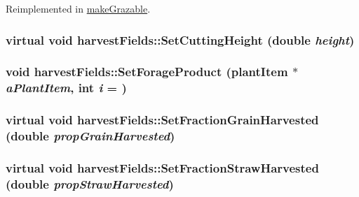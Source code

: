 Reimplemented in \hyperlink{classmake_grazable_a0c637b243ff0bc8232d121553f417573}{makeGrazable}.\hypertarget{classharvest_fields_a866acc00456f874d384414c557818194}{
\subsubsection[{SetCuttingHeight}]{\setlength{\rightskip}{0pt plus 5cm}virtual void harvestFields::SetCuttingHeight (double {\em height})}}
\label{classharvest_fields_a866acc00456f874d384414c557818194}
\hypertarget{classharvest_fields_a92f27195932617ba70c3c7043bf9898d}{
\subsubsection[{SetForageProduct}]{\setlength{\rightskip}{0pt plus 5cm}void harvestFields::SetForageProduct ({\bf plantItem} $\ast$ {\em aPlantItem}, \/  int {\em i} = {})}}
\label{classharvest_fields_a92f27195932617ba70c3c7043bf9898d}
\hypertarget{classharvest_fields_abd4843e05dba100f27d5c1b4a4e0a004}{
\subsubsection[{SetFractionGrainHarvested}]{\setlength{\rightskip}{0pt plus 5cm}virtual void harvestFields::SetFractionGrainHarvested (double {\em propGrainHarvested})}}
\label{classharvest_fields_abd4843e05dba100f27d5c1b4a4e0a004}
\hypertarget{classharvest_fields_a0d164d1fd85c0c4545fa90d92f5c00ea}{
\subsubsection[{SetFractionStrawHarvested}]{\setlength{\rightskip}{0pt plus 5cm}virtual void harvestFields::SetFractionStrawHarvested (double {\em propStrawHarvested})}}

